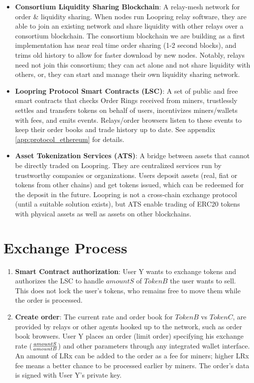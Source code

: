 \documentclass[UTF8,nofonts]{article}
\begin{document}
\begin{multicols}{2}
\begin{itemize}
\item \textbf{Consortium Liquidity Sharing Blockchain}: A relay-mesh network for order & liquidity sharing. When nodes run Loopring relay software, they are able to join an existing network and share liquidity with other relays over a consortium blockchain. The consortium blockchain we are building as a first implementation has near real time order sharing (1-2 second blocks), and trims old history to allow for faster download by new nodes. Notably, relays need not join this consortium; they can act alone and not share liquidity with others, or, they can start and manage their own liquidity sharing network.

\item \textbf{Loopring Protocol Smart Contracts (LSC)}: A set of public and free smart contracts that checks Order Rings received from miners, trustlessly settles and transfers tokens on behalf of users, incentivizes miners/wallets with fees, and emits events. Relays/order browsers listen to these events to keep their order books and trade history up to date. See appendix \ref{app:protocol_ethereum} for details.

\item \textbf{Asset Tokenization Services (ATS)}: A bridge between assets that cannot be directly traded on Loopring. They are centralized services run by trustworthy companies or organizations. Users deposit assets (real, fiat or tokens from other chains) and get tokens issued, which can be redeemed for the deposit in the future. Loopring is not a cross-chain exchange protocol (until a suitable solution exists), but ATS enable trading of ERC20 tokens \cite{ERC20} with physical assets as well as assets on other blockchains. 

\end{itemize}


\section{Exchange Process\label{sec:process}}
\begin{enumerate} 

\item \textbf{Smart Contract authorization}: User Y wants to exchange tokens and authorizes the LSC to handle $amountS$ of $TokenB$ the user wants to sell. This does not lock the user's tokens, who remains free to move them while the order is processed.

\item \textbf{Create order}: The current rate and order book for $TokenB$ vs $TokenC$, are provided by relays or other agents hooked up to the network, such as order book browsers. User Y places an order (limit order) specifying his exchange rate ($amountS \over amountB$) and other parameters through any integrated wallet interface. An amount of LRx can be added to the order as a fee for miners; higher LRx fee means a better chance to be processed earlier by miners. The order's data is signed with User Y's private key.


\end{enumerate}
\end{multicols}
\end{document}
